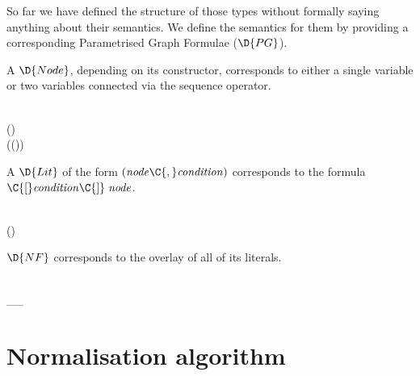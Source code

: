 So far we have defined the structure of those types without formally saying anything about their semantics. We define the semantics for them by providing a corresponding Parametrised Graph Formulae (\ensuremath{\D{PG}}).


A \ensuremath{\D{Node}}, depending on its constructor, corresponds to either a single variable or two variables connected via the sequence operator.
\begin{hscode}\SaveRestoreHook
{}%
%
%
\>[4]{}\;\mathbin{:}\;\;\;\<[E]%
\\
\>[4]{}\;(\;)\;\mathrel{=}\;\;\<[E]%
\\
\>[4]{}\;(\;(\C{,}))\;\mathrel{=}\;\;\;\C{\seq}\;\;\<[E]%
\ColumnHook
\end{hscode}\resethooks

A \ensuremath{\D{Lit}} of the form \ensuremath{(\Varid{node}\C{,}\Varid{condition})} corresponds to the formula \ensuremath{\C{[}\Varid{condition}\C{]}\;\Varid{node}}.


\begin{hscode}\SaveRestoreHook
{}%
%
%
\>[4]{}\;\mathbin{:}\;\;\;\<[E]%
\\
\>[4]{}\;(\C{,})\;\mathrel{=}\;\C{[}\C{]}\;\;\<[E]%
\ColumnHook
\end{hscode}\resethooks

\ensuremath{\D{NF}} corresponds to the overlay of all of its literals.


\begin{hscode}\SaveRestoreHook
{}%
%
%
\>[4]{}\;\mathbin{:}\;\;\;\<[E]%
\\
\>[4]{}\;\mathrel{=}\;\;\_\C{+}\_\;\;\;\;\<[E]%
\ColumnHook
\end{hscode}\resethooks


\section{Normalisation algorithm}

